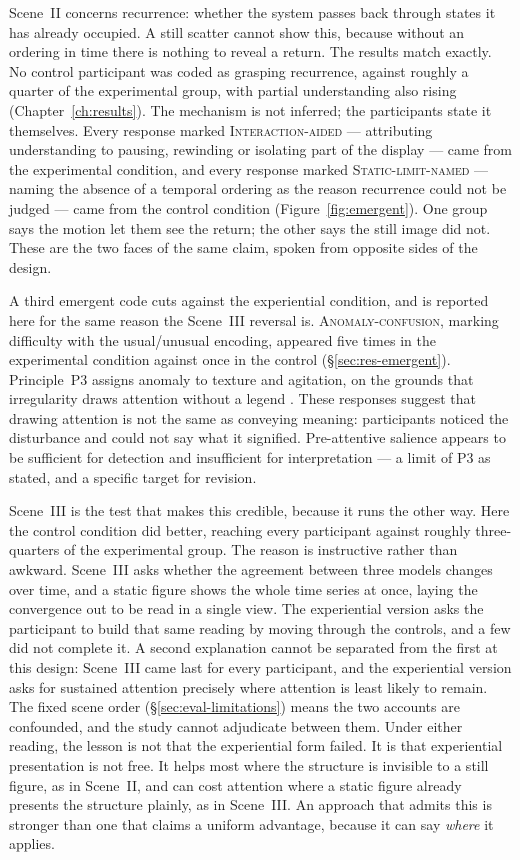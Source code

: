Scene~II concerns recurrence: whether the system passes back through states it has already occupied. A still scatter cannot show this, because without an ordering in time there is nothing to reveal a return. The results match exactly. No control participant was coded as grasping recurrence, against roughly a quarter of the experimental group, with partial understanding also rising (Chapter~\ref{ch:results}). The mechanism is not inferred; the participants state it themselves. Every response marked \textsc{Interaction-aided} --- attributing understanding to pausing, rewinding or isolating part of the display --- came from the experimental condition, and every response marked \textsc{Static-limit-named} --- naming the absence of a temporal ordering as the reason recurrence could not be judged --- came from the control condition (Figure~\ref{fig:emergent}). One group says the motion let them see the return; the other says the still image did not. These are the two faces of the same claim, spoken from opposite sides of the design.

A third emergent code cuts against the experiential condition, and is reported here for the same reason the Scene~III reversal is. \textsc{Anomaly-confusion}, marking difficulty with the usual/unusual encoding, appeared five times in the experimental condition against once in the control (\S\ref{sec:res-emergent}). Principle~P3 assigns anomaly to texture and agitation, on the grounds that irregularity draws attention without a legend \parencite{bertin1983, ware2021}. These responses suggest that drawing attention is not the same as conveying meaning: participants noticed the disturbance and could not say what it signified. Pre-attentive salience appears to be sufficient for detection and insufficient for interpretation --- a limit of P3 as stated, and a specific target for revision.

Scene~III is the test that makes this credible, because it runs the other way. Here the control condition did better, reaching every participant against roughly three-quarters of the experimental group. The reason is instructive rather than awkward. Scene~III asks whether the agreement between three models changes over time, and a static figure shows the whole time series at once, laying the convergence out to be read in a single view. The experiential version asks the participant to build that same reading by moving through the controls, and a few did not complete it. A second explanation cannot be separated from the first at this design: Scene~III came last for every participant, and the experiential version asks for sustained attention precisely where attention is least likely to remain. The fixed scene order (\S\ref{sec:eval-limitations}) means the two accounts are confounded, and the study cannot adjudicate between them. Under either reading, the lesson is not that the experiential form failed. It is that experiential presentation is not free. It helps most where the structure is invisible to a still figure, as in Scene~II, and can cost attention where a static figure already presents the structure plainly, as in Scene~III. An approach that admits this is stronger than one that claims a uniform advantage, because it can say \emph{where} it applies.

